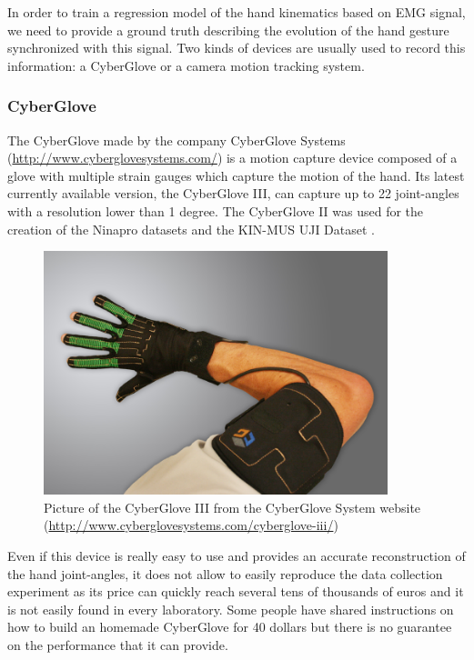 \documentclass{article}
\begin{document}
In order to train a regression model of the hand kinematics based on EMG signal, we need to provide a ground truth describing the evolution of the hand gesture synchronized with this signal.
	Two kinds of devices are usually used to record this information: a CyberGlove or a camera motion tracking system. 
	
	\subsubsection{CyberGlove}
	
	The CyberGlove made by the company CyberGlove Systems (\url{http://www.cyberglovesystems.com/}) is a motion capture device composed of a glove with multiple strain gauges which capture the motion of the hand. Its latest currently available version, the CyberGlove III, can capture up to 22 joint-angles with a resolution lower than 1 degree. The  CyberGlove II was used for the creation of the Ninapro datasets \cite{ref:ninapro, ref:comp6EMGsetup} and the KIN-MUS UJI Dataset \cite{ref:KinMusUji}.
	
	\begin{figure}[h]
		\centering
		\includegraphics[width=10cm]{images/cyberGlove3.png}
		\caption{Picture of the CyberGlove III from the CyberGlove System website (\url{http://www.cyberglovesystems.com/cyberglove-iii/})}
		\label{fig:cyberGlove3}
	\end{figure}
	
	Even if this device is really easy to use and provides an accurate reconstruction of the hand joint-angles, it does not allow to easily reproduce the data collection experiment as its price can quickly reach several tens of thousands of euros and it is not easily found in every laboratory. Some people have shared instructions on how to build an homemade CyberGlove for 40 dollars \cite{ref:diyCyberGlove} but there is no guarantee on the performance that it can provide.
	
\end{document}
